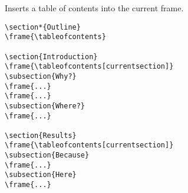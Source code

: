 \begin{command}{\tableofcontents{}}
  Inserts a table of contents into the current frame.
  \example
\begin{verbatim}
\section*{Outline}
\frame{\tableofcontents}

\section{Introduction}
\frame{\tableofcontents[currentsection]}
\subsection{Why?}
\frame{...}
\frame{...}
\subsection{Where?}
\frame{...}

\section{Results}
\frame{\tableofcontents[currentsection]}
\subsection{Because}
\frame{...}
\subsection{Here}
\frame{...}
\end{verbatim}


\end{command}
